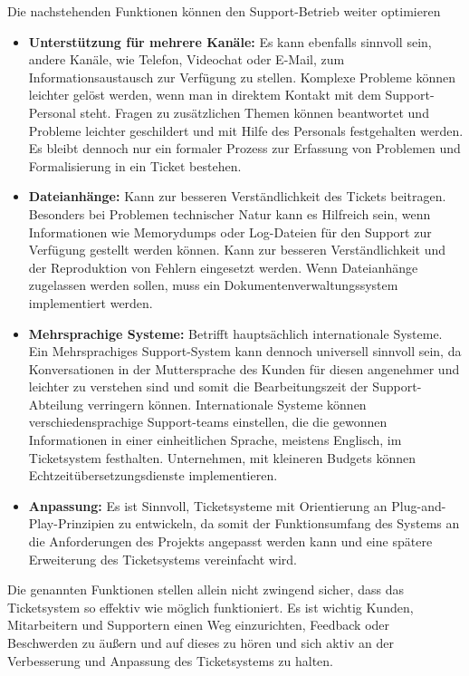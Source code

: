   Die nachstehenden Funktionen können den Support-Betrieb weiter optimieren
  
  \begin{itemize}
			\item \textbf{Unterstützung für mehrere Kanäle:} Es kann ebenfalls sinnvoll sein, andere Kanäle, wie Telefon, Videochat oder E-Mail, zum Informationsaustausch zur Verfügung zu stellen. Komplexe Probleme können leichter gelöst werden, wenn man in direktem Kontakt mit dem Support-Personal steht. Fragen zu zusätzlichen Themen können beantwortet und Probleme leichter geschildert und mit Hilfe des Personals festgehalten werden. Es bleibt dennoch nur ein formaler Prozess zur Erfassung von Problemen und Formalisierung in ein Ticket bestehen. \\
			\item \textbf{Dateianhänge:} Kann zur besseren Verständlichkeit des Tickets beitragen. Besonders bei Problemen technischer Natur kann es Hilfreich sein, wenn Informationen wie Memorydumps oder Log-Dateien für den Support zur Verfügung gestellt werden können. Kann zur besseren Verständlichkeit und der Reproduktion von Fehlern eingesetzt werden. Wenn Dateianhänge zugelassen werden sollen, muss ein Dokumentenverwaltungssystem implementiert werden.\\
			\item \textbf{Mehrsprachige Systeme:} Betrifft hauptsächlich internationale Systeme. Ein Mehrsprachiges Support-System kann dennoch universell sinnvoll sein, da Konversationen in der Muttersprache des Kunden für diesen angenehmer und leichter zu verstehen sind und somit die Bearbeitungszeit der Support-Abteilung verringern können. Internationale Systeme können verschiedensprachige Support-teams einstellen, die die gewonnen Informationen in einer einheitlichen Sprache, meistens Englisch, im Ticketsystem festhalten. Unternehmen, mit kleineren Budgets können Echtzeitübersetzungsdienste implementieren. \\
			\item \textbf{Anpassung:} Es ist Sinnvoll, Ticketsysteme mit Orientierung an Plug-and-Play-Prinzipien zu entwickeln, da somit der Funktionsumfang des Systems an die Anforderungen des Projekts angepasst werden kann und eine spätere Erweiterung des Ticketsystems vereinfacht wird. \\
		\end{itemize}  
Die genannten Funktionen stellen allein nicht zwingend sicher, dass das Ticketsystem so effektiv wie möglich funktioniert. Es ist wichtig Kunden, Mitarbeitern und Supportern einen Weg einzurichten, Feedback oder Beschwerden zu äußern und auf dieses zu hören und sich aktiv an der Verbesserung und Anpassung des Ticketsystems zu halten. \\

